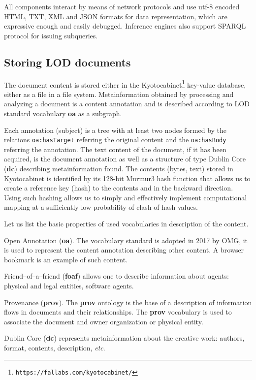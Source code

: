 \documentclass[conference,a4paper]{IEEEtran}
\providecommand\url[1]{\texttt{#1}}
\begin{document}
All components interact by means of network protocols and use utf-8 encoded HTML, TXT, XML and JSON formats for data representation, which are expressive enough and easily debugged.  Inference engines also support SPARQL protocol for issuing subqueries.

\subsection{Storing LOD documents}

The document content is stored either in the Kyotocabinet\footnote{\url{https://fallabs.com/kyotocabinet/}} key-value database, either as a file in a file system.  Metainformation obtained by processing and analyzing a document is a content annotation and is described according to LOD standard vocabulary \textbf{oa} as a subgraph.

Each annotation (subject) is a tree with at least two nodes formed by the relations \texttt{oa:hasTarget} referring the original content and the \texttt{oa:hasBody} referring the annotation.  The text content of the document, if it has been acquired, is the document annotation as well as a structure of type Dublin Core (\textbf{dc}) describing metainformation found.  The contents (bytes, text) stored in Kyotocabinet is identified by its 128-bit Murmur3 hash function that allows us to create a reference key (hash) to the contents and in the backward direction.  Using such hashing allows us to simply and effectively implement computational mapping at a sufficiently low probability of clash of hash values.

Let us list the basic properties of used vocabularies in description of the content.

Open Annotation (\textbf{oa}). The vocabulary standard is adopted in 2017 by OMG, it is used to represent the content annotation describing other content.  A browser bookmark is an example of such content.

Friend--of--a--friend (\textbf{foaf}) allows one to describe information about agents: physical and legal entities, software agents.

Provenance (\textbf{prov}).  The \textbf{prov} ontology is the base of a description of information flows in documents and their relationships. The \textbf{prov} vocabulary is used to associate the document and owner organization or physical entity.

Dublin Core (\textbf{dc}) represents metainformation about the creative work: authors, format, contents, description, \emph{etc}.
\end{document}
